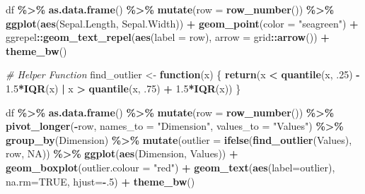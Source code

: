 \documentclass[
]{book}
\newenvironment{Shaded}{\begin{snugshade}}{\end{snugshade}}
\newcommand{\AttributeTok}[1]{\textcolor[rgb]{0.13,0.29,0.53}{#1}}
\newcommand{\CommentTok}[1]{\textcolor[rgb]{0.56,0.35,0.01}{\textit{#1}}}
\newcommand{\ConstantTok}[1]{\textcolor[rgb]{0.56,0.35,0.01}{#1}}
\newcommand{\ControlFlowTok}[1]{\textcolor[rgb]{0.13,0.29,0.53}{\textbf{#1}}}
\newcommand{\DecValTok}[1]{\textcolor[rgb]{0.00,0.00,0.81}{#1}}
\newcommand{\FloatTok}[1]{\textcolor[rgb]{0.00,0.00,0.81}{#1}}
\newcommand{\FunctionTok}[1]{\textcolor[rgb]{0.13,0.29,0.53}{\textbf{#1}}}
\newcommand{\NormalTok}[1]{#1}
\newcommand{\OtherTok}[1]{\textcolor[rgb]{0.56,0.35,0.01}{#1}}
\newcommand{\SpecialCharTok}[1]{\textcolor[rgb]{0.81,0.36,0.00}{\textbf{#1}}}
\newcommand{\StringTok}[1]{\textcolor[rgb]{0.31,0.60,0.02}{#1}}
\begin{document}
\begin{Shaded}
\begin{Highlighting}[]
\NormalTok{df }\SpecialCharTok{\%\textgreater{}\%} 
  \FunctionTok{as.data.frame}\NormalTok{() }\SpecialCharTok{\%\textgreater{}\%} 
  \FunctionTok{mutate}\NormalTok{(}\AttributeTok{row =} \FunctionTok{row\_number}\NormalTok{()) }\SpecialCharTok{\%\textgreater{}\%} 
  \FunctionTok{ggplot}\NormalTok{(}\FunctionTok{aes}\NormalTok{(Sepal.Length, Sepal.Width)) }\SpecialCharTok{+}
  \FunctionTok{geom\_point}\NormalTok{(}\AttributeTok{color =} \StringTok{"seagreen"}\NormalTok{) }\SpecialCharTok{+}
\NormalTok{  ggrepel}\SpecialCharTok{::}\FunctionTok{geom\_text\_repel}\NormalTok{(}\FunctionTok{aes}\NormalTok{(}\AttributeTok{label =}\NormalTok{ row), }\AttributeTok{arrow =}\NormalTok{ grid}\SpecialCharTok{::}\FunctionTok{arrow}\NormalTok{()) }\SpecialCharTok{+}
  \FunctionTok{theme\_bw}\NormalTok{()}

\CommentTok{\# Helper Function}
\NormalTok{find\_outlier }\OtherTok{\textless{}{-}} \ControlFlowTok{function}\NormalTok{(x) \{}
  \FunctionTok{return}\NormalTok{(x }\SpecialCharTok{\textless{}} \FunctionTok{quantile}\NormalTok{(x, .}\DecValTok{25}\NormalTok{) }\SpecialCharTok{{-}} \FloatTok{1.5}\SpecialCharTok{*}\FunctionTok{IQR}\NormalTok{(x) }\SpecialCharTok{|}\NormalTok{ x }\SpecialCharTok{\textgreater{}} \FunctionTok{quantile}\NormalTok{(x, .}\DecValTok{75}\NormalTok{) }\SpecialCharTok{+} \FloatTok{1.5}\SpecialCharTok{*}\FunctionTok{IQR}\NormalTok{(x))}
\NormalTok{\}}

\NormalTok{df }\SpecialCharTok{\%\textgreater{}\%} 
  \FunctionTok{as.data.frame}\NormalTok{() }\SpecialCharTok{\%\textgreater{}\%} 
  \FunctionTok{mutate}\NormalTok{(}\AttributeTok{row =} \FunctionTok{row\_number}\NormalTok{()) }\SpecialCharTok{\%\textgreater{}\%} 
  \FunctionTok{pivot\_longer}\NormalTok{(}\SpecialCharTok{{-}}\NormalTok{row, }\AttributeTok{names\_to =} \StringTok{"Dimension"}\NormalTok{, }\AttributeTok{values\_to =} \StringTok{"Values"}\NormalTok{) }\SpecialCharTok{\%\textgreater{}\%} 
  \FunctionTok{group\_by}\NormalTok{(Dimension) }\SpecialCharTok{\%\textgreater{}\%} 
  \FunctionTok{mutate}\NormalTok{(}\AttributeTok{outlier =} \FunctionTok{ifelse}\NormalTok{(}\FunctionTok{find\_outlier}\NormalTok{(Values), row, }\ConstantTok{NA}\NormalTok{)) }\SpecialCharTok{\%\textgreater{}\%} 
  \FunctionTok{ggplot}\NormalTok{(}\FunctionTok{aes}\NormalTok{(Dimension, Values)) }\SpecialCharTok{+}
  \FunctionTok{geom\_boxplot}\NormalTok{(}\AttributeTok{outlier.colour =} \StringTok{"red"}\NormalTok{) }\SpecialCharTok{+}
  \FunctionTok{geom\_text}\NormalTok{(}\FunctionTok{aes}\NormalTok{(}\AttributeTok{label=}\NormalTok{outlier), }\AttributeTok{na.rm=}\ConstantTok{TRUE}\NormalTok{, }\AttributeTok{hjust=}\SpecialCharTok{{-}}\NormalTok{.}\DecValTok{5}\NormalTok{) }\SpecialCharTok{+}
  \FunctionTok{theme\_bw}\NormalTok{()}
\end{Highlighting}
\end{Shaded}
\end{document}
